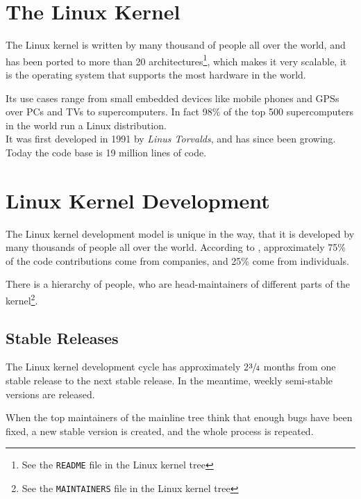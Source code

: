 \documentclass[a4paper,11pt]{report}
\newcommand{\f}{\footnote{\fn}}
\newcommand{\textcode}[1]{\fboxsep=1pt\texttt{\colorbox{gray!20}{#1}}}
\begin{document}
            
            \section{The Linux Kernel}

            \def \fn {See the \textcode{README} file in the Linux kernel tree}

The Linux kernel is written by many thousand of people all over 
the world, and has been ported to more than 20 architectures\f, which makes it 
very scalable, it is the operating system that supports the most hardware in
the world\cite{22thbirthday,gkh}.

Its use cases range from small embedded devices like mobile phones and GPSs over PCs and TVs to 
supercomputers. In fact 98\% of the top 500 supercomputers in the world run a 
Linux distribution\cite{top500}. 
\\

It was first developed in 1991 by \emph{Linus Torvalds}, and has since been 
growing. Today the code base is 19 million lines of code.


            \section{Linux Kernel Development}

            \def \fn {See the \textcode{MAINTAINERS} file in  
            the Linux kernel tree}

The Linux kernel development model is unique in the  way, that it is developed 
by many thousands of people all over the world. According to \cite{gkh}, 
approximately 75\% of the code contributions come from companies, and 25\% come from 
individuals. 

There is a hierarchy of people, who are head-maintainers of different parts of 
the kernel\f.


            \subsection*{Stable Releases}

The Linux kernel development cycle has approximately 2$\sfrac{3}{4}$ months 
from one stable release to the next stable release\cite
    {crystalball}.
In the meantime, weekly semi-stable versions are released.

When the top maintainers of the mainline tree think that enough bugs have been 
fixed, a new stable version is created, and the whole process is repeated.
\end{document}
